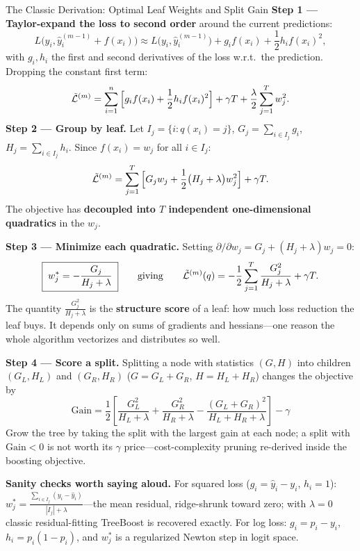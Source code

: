 \begin{mathresult}{The Classic Derivation: Optimal Leaf Weights and Split Gain}
\textbf{Step 1 --- Taylor-expand the loss to second order} around the current predictions:
\begin{equation}
L\big(y_i, \hat{y}_i^{(m-1)} + f(x_i)\big) \approx L\big(y_i, \hat{y}_i^{(m-1)}\big) + g_i f(x_i) + \frac{1}{2} h_i f(x_i)^2,
\end{equation}
with $g_i, h_i$ the first and second derivatives of the loss w.r.t.\ the prediction. Dropping the constant first term:
\begin{equation}
\tilde{\mathcal{L}}^{(m)} = \sum_{i=1}^n \Big[ g_i f(x_i) + \frac{1}{2} h_i f(x_i)^2 \Big] + \gamma T + \frac{\lambda}{2}\sum_{j=1}^T w_j^2.
\end{equation}
\textbf{Step 2 --- Group by leaf.} Let $I_j = \{i : q(x_i) = j\}$, $G_j = \sum_{i \in I_j} g_i$, $H_j = \sum_{i \in I_j} h_i$. Since $f(x_i) = w_j$ for all $i \in I_j$:
\begin{equation}
\tilde{\mathcal{L}}^{(m)} = \sum_{j=1}^{T} \Big[ G_j w_j + \frac{1}{2}\big(H_j + \lambda\big) w_j^2 \Big] + \gamma T.
\end{equation}
The objective has \textbf{decoupled into $T$ independent one-dimensional quadratics} in the $w_j$.

\textbf{Step 3 --- Minimize each quadratic.} Setting $\partial/\partial w_j = G_j + (H_j + \lambda) w_j = 0$:
\begin{equation}
\boxed{\; w_j^{*} = -\frac{G_j}{H_j + \lambda} \;}
\qquad \text{giving} \qquad
\tilde{\mathcal{L}}^{(m)}(q) = -\frac{1}{2} \sum_{j=1}^{T} \frac{G_j^2}{H_j + \lambda} + \gamma T.
\end{equation}
The quantity $\frac{G_j^2}{H_j+\lambda}$ is the \textbf{structure score} of a leaf: how much loss reduction the leaf buys. It depends only on sums of gradients and hessians---one reason the whole algorithm vectorizes and distributes so well.

\textbf{Step 4 --- Score a split.} Splitting a node with statistics $(G, H)$ into children $(G_L, H_L)$ and $(G_R, H_R)$ ($G = G_L + G_R$, $H = H_L + H_R$) changes the objective by
\begin{equation}
\boxed{\;\text{Gain} = \frac{1}{2}\left[ \frac{G_L^2}{H_L + \lambda} + \frac{G_R^2}{H_R + \lambda} - \frac{(G_L + G_R)^2}{H_L + H_R + \lambda} \right] - \gamma \;}
\end{equation}
Grow the tree by taking the split with the largest gain at each node; a split with $\text{Gain} < 0$ is not worth its $\gamma$ price---cost-complexity pruning re-derived inside the boosting objective.

\textbf{Sanity checks worth saying aloud.} For squared loss ($g_i = \hat{y}_i - y_i$, $h_i = 1$): $w_j^* = \frac{\sum_{i \in I_j}(y_i - \hat{y}_i)}{|I_j| + \lambda}$---the mean residual, ridge-shrunk toward zero; with $\lambda = 0$ classic residual-fitting TreeBoost is recovered exactly. For log loss: $g_i = p_i - y_i$, $h_i = p_i(1-p_i)$, and $w_j^*$ is a regularized Newton step in logit space.
\end{mathresult}


